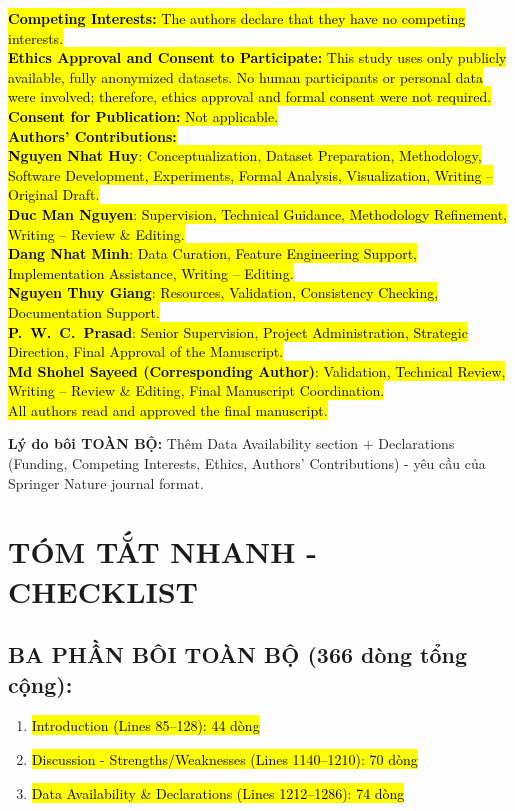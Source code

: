\documentclass[11pt,a4paper]{article}
\begin{document}
{\begin{minipage}{\dimexpr\textwidth-2\fboxsep-2\fboxrule}
\hl{\textbf{Competing Interests:} The authors declare that they have no competing interests.}\\[0.3em]

\hl{\textbf{Ethics Approval and Consent to Participate:} This study uses only publicly available, fully anonymized datasets. No human participants or personal data were involved; therefore, ethics approval and formal consent were not required.}\\[0.3em]

\hl{\textbf{Consent for Publication:} Not applicable.}\\[0.5em]

\hl{\textbf{Authors' Contributions:}}\\
\hl{\textbf{Nguyen Nhat Huy}: Conceptualization, Dataset Preparation, Methodology, Software Development, Experiments, Formal Analysis, Visualization, Writing – Original Draft.}\\
\hl{\textbf{Duc Man Nguyen}: Supervision, Technical Guidance, Methodology Refinement, Writing – Review \& Editing.}\\
\hl{\textbf{Dang Nhat Minh}: Data Curation, Feature Engineering Support, Implementation Assistance, Writing – Editing.}\\
\hl{\textbf{Nguyen Thuy Giang}: Resources, Validation, Consistency Checking, Documentation Support.}\\
\hl{\textbf{P.~W.~C.~Prasad}: Senior Supervision, Project Administration, Strategic Direction, Final Approval of the Manuscript.}\\
\hl{\textbf{Md Shohel Sayeed (Corresponding Author)}: Validation, Technical Review, Writing – Review \& Editing, Final Manuscript Coordination.}\\[0.3em]

\hl{All authors read and approved the final manuscript.}
\end{minipage}}

\textbf{Lý do bôi TOÀN BỘ:} Thêm Data Availability section + Declarations (Funding, Competing Interests, Ethics, Authors' Contributions) - yêu cầu của Springer Nature journal format.

\newpage
\section{TÓM TẮT NHANH - CHECKLIST}

\subsection*{BA PHẦN BÔI TOÀN BỘ (366 dòng tổng cộng):}
\begin{enumerate}
    \item \hl{Introduction (Lines 85--128): 44 dòng}
    \item \hl{Discussion - Strengths/Weaknesses (Lines 1140--1210): 70 dòng}
    \item \hl{Data Availability \& Declarations (Lines 1212--1286): 74 dòng}
\end{enumerate}
\end{document}
